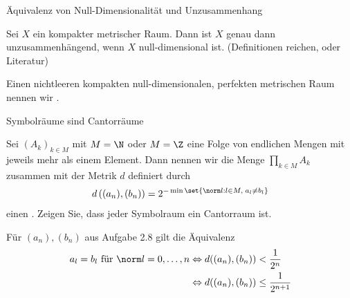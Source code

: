 \begin{uebung} Äquivalenz von Null-Dimensionalität und Unzusammenhang

Sei $X$ ein kompakter metrischer Raum. Dann ist $X$ genau dann unzusammenhängend, wenn $X$ null-dimensional ist. (Definitionen reichen, oder Literatur)
\end{uebung}
\begin{definition}
Einen nichtleeren kompakten null-dimensionalen, perfekten metrischen Raum nennen wir .
\end{definition}
\begin{uebung} Symbolräume sind Cantorräume

Sei $(A_k)_{k \in M}$ mit $M = \N$ oder $M = \Z$ eine Folge von endlichen Mengen mit jeweils mehr als einem Element. Dann nennen wir die Menge $\prod_{k \in M} A_k$ zusammen mit der Metrik $d$ definiert durch 
\begin{align*}
  d\left((a_n), (b_n)\right) = 2^{- \min\set{\norm l: l \in M, \; a_l \neq b_l}}
\end{align*}
 einen . Zeigen Sie, dass jeder Symbolraum ein Cantorraum ist. 
\end{uebung}
\begin{bemerkung}
  Für $(a_n), (b_n)$ aus Aufgabe 2.8 gilt die Äquivalenz
  \begin{align*}
    a_l = b_l \text{ für } \norm l = 0, \dots, n &\Leftrightarrow d((a_n), (b_n)) < \frac 1 {2^n}\\
&\Leftrightarrow d((a_n), (b_n)) \leq \frac 1 {2^{n+1}}
  \end{align*}
\end{bemerkung}

